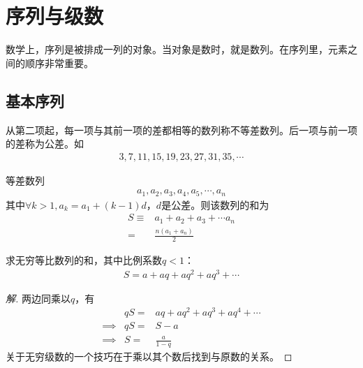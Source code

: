 
\chapter{序列与级数}
\label{chap:series}

数学上，序列是被排成一列的对象。当对象是数时，就是数列。在序列里，元素之间的顺序非常重要。

\section{基本序列}
\label{sec:basic-series}

\begin{example}
  从第二项起，每一项与其前一项的差都相等的数列称不等差数列。后一项与前一项的差称为公差。如
  \begin{align*}
    3,7,11,15,19,23,27,31,35,\cdots
  \end{align*}
\end{example}

\begin{example}等差数列
  \begin{align*}
    a_1, a_2, a_3, a_4, a_5, \cdots, a_n
  \end{align*}
  其中$\forall k>1, a_k=a_1 + (k-1)d$，$d$是公差。则该数列的和为
  \begin{align*}
    S\equiv & a_1 + a_2 + a_3 + \cdots a_n\\
          = & \frac{n(a_1+a_n)}{2}
  \end{align*}
\end{example}

\begin{example}
  求无穷等比数列的和，其中比例系数$q<1$：
  \begin{align*}
    S=a + aq + aq^2 + aq^3 + \cdots
  \end{align*}
\end{example}
\begin{proof}[解]
  两边同乘以$q$，有
  \begin{eqnarray*}
            & qS=& aq + aq^2 + aq^3 + aq^4 + \cdots\\
    \implies& qS=& S - a\\
    \implies&  S=& \frac{a}{1-q}
  \end{eqnarray*}
  关于无穷级数的一个技巧在于乘以其个数后找到与原数的关系。
\end{proof}

